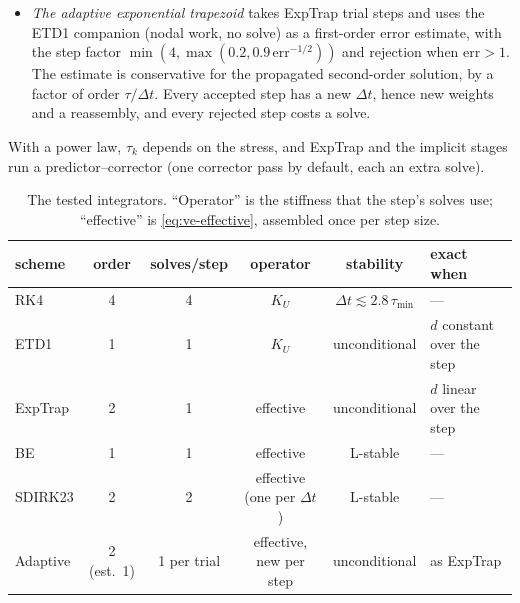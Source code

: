 \documentclass[11pt]{article}
\numberwithin{equation}{section}
\newcommand{\code}[1]{\texttt{#1}}
\begin{document}
\begin{itemize}[leftmargin=*]
\begin{equation}
\begin{array}{c|cc}
    & \tfrac12 & \tfrac12
  \end{array}
  \end{equation}
  Each stage is a backward-Euler solve of step $\gamma\Delta t$; both share
  one effective operator, so it costs two solves and one assembly per step
  size. It is second order ($b^{T}c=\tfrac12$) and L-stable:
  $R(\infty)=1-b^{T}A^{-1}\mathbf 1=1-(4\gamma-1)/(2\gamma^2)=0$ exactly for
  this $\gamma$, with stage order 1 and stage loads at
  $t_n+\gamma\Delta t$ and $t_n+(1-\gamma)\Delta t$. MFEM's default
  \code{SDIRK23Solver()} is the third-order, A- but not L-stable variant;
  the drivers use the L-stable one. The displacement left by the second
  stage belongs to the stage state, so an observation between steps costs
  an extra unrelaxed solve.
\item \emph{The adaptive exponential trapezoid} takes ExpTrap trial steps
  and uses the ETD1 companion (nodal work, no solve) as a first-order error
  estimate, with the step factor $\min(4,\max(0.2,0.9\,\text{err}^{-1/2}))$
  and rejection when $\text{err}>1$. The estimate is conservative for the
  propagated second-order solution, by a factor of order $\tau/\Delta t$.
  Every accepted step has a new $\Delta t$, hence new weights and a
  reassembly, and every rejected step costs a solve.
\end{itemize}
With a power law, $\tau_k$ depends on the stress, and ExpTrap and the
implicit stages run a predictor--corrector (one corrector pass by
default, each an extra solve).

\begin{table}[H]
\centering
\small
\begin{tabular}{@{}lccccl@{}}
\toprule
scheme & order & solves/step & operator & stability & exact when \\
\midrule
RK4 & 4 & 4 & $K_U$ & $\Delta t\lesssim2.8\,\tau_{\min}$ & --- \\
ETD1 & 1 & 1 & $K_U$ & unconditional & $d$ constant over the step \\
ExpTrap & 2 & 1 & effective & unconditional & $d$ linear over the step \\
BE & 1 & 1 & effective & L-stable & --- \\
SDIRK23 & 2 & 2 & effective (one per $\Delta t$) & L-stable & --- \\
Adaptive & 2 (est.\ 1) & 1 per trial & effective, new per step & unconditional & as ExpTrap \\
\bottomrule
\end{tabular}
\caption{The tested integrators. ``Operator'' is the stiffness that the
step's solves use; ``effective'' is \eqref{eq:ve-effective}, assembled
once per step size.}
\label{tab:steppers}
\end{table}
\end{document}
